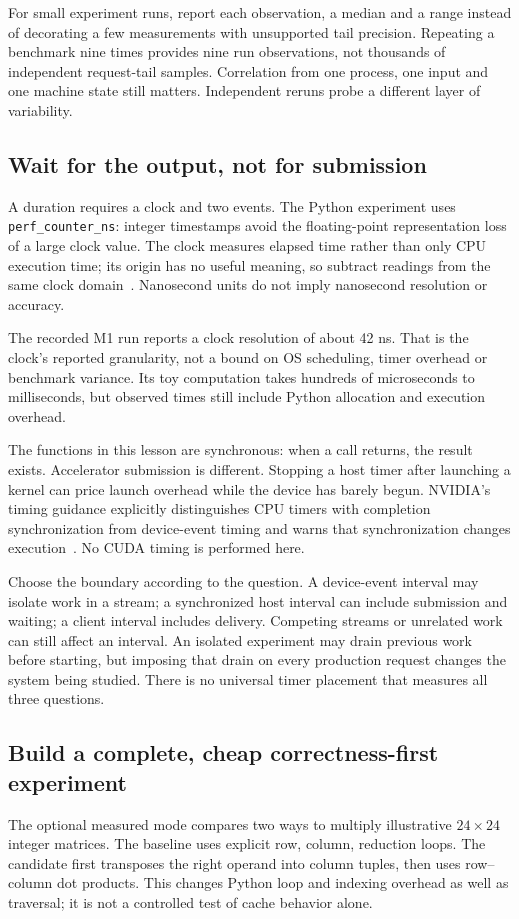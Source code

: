 For small experiment runs, report each observation, a median and a
range instead of decorating a few measurements with unsupported
tail precision. Repeating a benchmark nine times provides nine
run observations, not thousands of independent request-tail samples.
Correlation from one process, one input and one machine state still
matters. Independent reruns probe a different layer of variability.

\subsection{Wait for the output, not for submission}
A duration requires a clock and two events. The Python experiment
uses \texttt{perf\_counter\_ns}: integer timestamps avoid the floating-point
representation loss of a large clock value. The clock measures elapsed
time rather than only CPU execution time; its origin has no useful
meaning, so subtract readings from the same clock domain~\cite{python2026time}.
Nanosecond units do not imply nanosecond resolution or accuracy.

The recorded M1 run reports a clock resolution of about 42 ns.
That is the clock's reported granularity, not a bound on OS scheduling,
timer overhead or benchmark variance. Its toy computation takes
hundreds of microseconds to milliseconds, but observed times still
include Python allocation and execution overhead.

The functions in this lesson are synchronous: when a call returns,
the result exists. Accelerator submission is different. Stopping a host
timer after launching a kernel can price launch overhead while the
device has barely begun. NVIDIA's timing guidance explicitly distinguishes
CPU timers with completion synchronization from device-event timing
and warns that synchronization changes execution~\cite{nvidia2026bestpractices}.
No CUDA timing is performed here.

Choose the boundary according to the question. A device-event interval
may isolate work in a stream; a synchronized host interval can include
submission and waiting; a client interval includes delivery. Competing
streams or unrelated work can still affect an interval. An isolated
experiment may drain previous work before starting, but imposing that
drain on every production request changes the system being studied.
There is no universal timer placement that measures all three questions.

\subsection{Build a complete, cheap correctness-first experiment}
The optional measured mode compares two ways to multiply illustrative
$24\times24$ integer matrices. The baseline uses explicit row, column,
reduction loops. The candidate first transposes the right operand into
column tuples, then uses row--column dot products. This changes Python
loop and indexing overhead as well as traversal; it is not a controlled
test of cache behavior alone.

